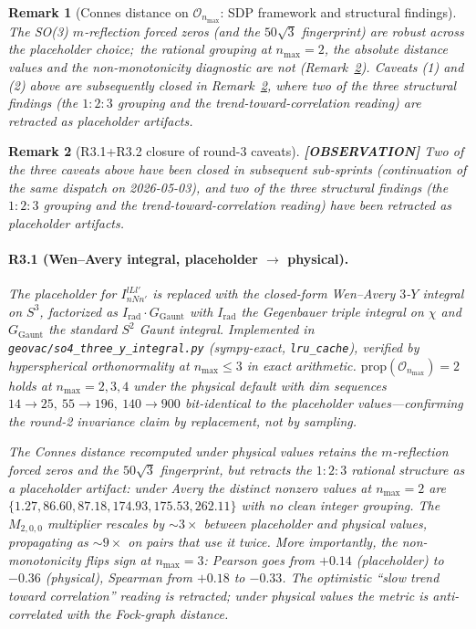 \documentclass[11pt]{article}
\newtheorem{remark}{Remark}
\begin{document}
\begin{remark}[Connes distance on $\mathcal{O}_{n_{\max}}$: SDP framework
and structural findings]
The SO(3) $m$-reflection forced zeros (and the $50\sqrt{3}$
fingerprint) are robust across the placeholder choice;\ the rational
grouping at $n_{\max} = 2$, the absolute distance values and the
non-monotonicity diagnostic are not (Remark~\ref{rem:r31_r32_update}).  Caveats (1) and (2) above are subsequently closed in
Remark~\ref{rem:r31_r32_update}, where two of the three structural
findings (the $1{:}2{:}3$ grouping and the trend-toward-correlation
reading) are retracted as placeholder artifacts.
\end{remark}

\begin{remark}[R3.1+R3.2 closure of round-3 caveats]
\label{rem:r31_r32_update}
\textbf{[OBSERVATION]} Two of the three caveats above have been closed in subsequent
sub-sprints (continuation of the same dispatch on 2026-05-03), and
two of the three structural findings (the $1{:}2{:}3$ grouping and the
trend-toward-correlation reading) have been retracted as placeholder
artifacts.

\paragraph{R3.1 (Wen--Avery integral, placeholder $\to$
physical).}  The placeholder for $I_{n N n'}^{l L l'}$ is replaced
with the closed-form Wen--Avery $3$-$Y$ integral on $S^3$,
factorized as $I_{\mathrm{rad}} \cdot G_{\mathrm{Gaunt}}$ with
$I_{\mathrm{rad}}$ the Gegenbauer triple integral on $\chi$ and
$G_{\mathrm{Gaunt}}$ the standard $S^2$ Gaunt integral.
Implemented in \texttt{geovac/so4\_three\_y\_integral.py}
(sympy-exact, \texttt{lru\_cache}), verified by hyperspherical
orthonormality at $n_{\max} \le 3$ in exact arithmetic.
$\mathrm{prop}(\mathcal{O}_{n_{\max}}) = 2$ holds at $n_{\max} =
2, 3, 4$ under the physical default with dim sequences $14 \to
25,\ 55 \to 196,\ 140 \to 900$ \emph{bit-identical} to the
placeholder values---confirming the round-2 invariance claim by
replacement, not by sampling.

The Connes distance recomputed under physical values retains
the $m$-reflection forced zeros and the $50\sqrt{3}$ fingerprint,
but \emph{retracts} the $1 : 2 : 3$ rational structure as a
placeholder artifact: under Avery the distinct nonzero values at
$n_{\max} = 2$ are $\{1.27, 86.60, 87.18, 174.93, 175.53,
262.11\}$ with no clean integer grouping.  The $M_{2,0,0}$
multiplier rescales by $\sim 3\times$ between placeholder and
physical values, propagating as $\sim 9\times$ on pairs that use
it twice.  More importantly, the non-monotonicity \emph{flips
sign} at $n_{\max} = 3$: Pearson goes from $+0.14$ (placeholder)
to $-0.36$ (physical), Spearman from $+0.18$ to $-0.33$.  The
optimistic ``slow trend toward correlation'' reading is
retracted; under physical values the metric is
\emph{anti-correlated} with the Fock-graph distance.  


\end{remark}
\end{document}
